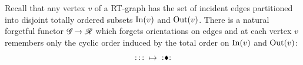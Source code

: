 Recall that any vertex $v$ of a RT-graph has the set of incident edges
partitioned into disjoint totally ordered subsets $\operatorname{In}(v)$ and
$\operatorname{Out}(v)$.  There is a natural forgetful functor $\mathscr{G}_{}\to\mathscr{R}$ which
forgets orientations on edges and at each vertex $v$ remembers only
the cyclic order induced by the total order on $\operatorname{In}(v)$ and $\operatorname{Out}(v)$:
\begin{equation*}
    {%
      \xy*!LC\xybox{
        (0,1)*+[F]{\ };%
        (-1,0)**\dir{-},(-0.5,0)**\dir{-},%
        (0,0.5)*+{\ldots},(1,0)**\dir{-},%
        (-1,2)**\dir{-},(-0.5,2)**\dir{-},%
        (0,1.5)*+{\ldots},(1,2)**\dir{-},%
        }\endxy\mapsto
      \xy*!LC\xybox{
        (0,1)*{\bullet};%
        (-1,0)**\dir{-},(-0.5,0)**\dir{-},%
        (0,0.5)*+{\ldots},(1,0)**\dir{-},%
        (-1,2)**\dir{-},(-0.5,2)**\dir{-},%
        (0,1.5)*+{\ldots},(1,2)**\dir{-},%
        ,(0,1.3);(0,1)%
        ,{\ellipse<>{-}},(0.02,1.3)*{\scriptscriptstyle{\langle}}
        }\endxy
      }
\end{equation*}

